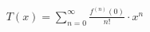 \documentclass[preview]{standalone}
\begin{document}
\begin{align*}
T\left(x\right)=\sum_{n=0}^{\infty}\frac{f^{\left(n\right)}\left(0\right)}{n!}\cdot x^{n}
\end{align*}
\end{document}
